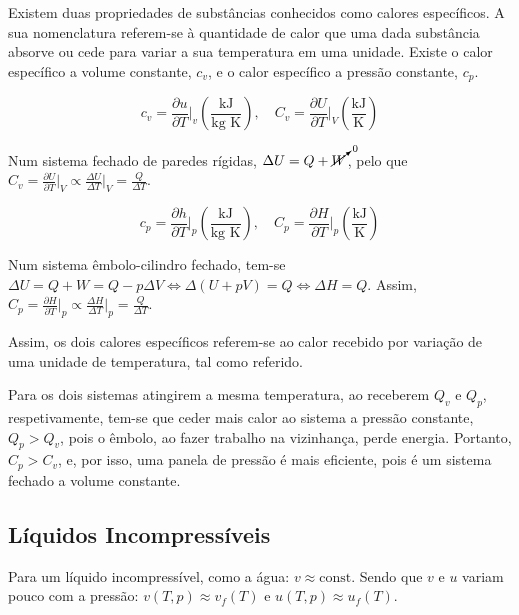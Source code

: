 Existem duas propriedades de substâncias conhecidos como calores específicos. A sua nomenclatura referem-se à quantidade de calor que uma dada substância absorve ou cede para variar a sua temperatura em uma unidade. Existe o calor específico a volume constante, $c_v$, e o calor específico a pressão constante, $c_p$.  

\begin{equation}
    c_v = \frac{\partial u}{\partial T} \bigr|_{v} \left( \frac{\text{kJ}}{\text{kg K}} \right), \quad C_v = \frac{\partial U}{\partial T} \bigr|_{V} \left( \frac{\text{kJ}}{\text{K}} \right)
\end{equation}

Num sistema fechado de paredes rígidas, $\Delta U = Q + \cancelto{0}{W}$, pelo que $C_v = \frac{\partial U}{\partial T} \bigr|_{V} \propto \frac{\Delta U}{\Delta T}\bigr|_{V} = \frac{Q}{\Delta T}$.

\begin{equation}
    c_p = \frac{\partial h}{\partial T} \bigr|_{p} \left( \frac{\text{kJ}}{\text{kg K}} \right), \quad C_p = \frac{\partial H}{\partial T} \bigr|_{p} \left( \frac{\text{kJ}}{\text{K}} \right)
\end{equation}

Num sistema êmbolo-cilindro fechado, tem-se $\Delta U = Q + W = Q - p \Delta V \Longleftrightarrow \Delta (U + pV) = Q \Longleftrightarrow \Delta H = Q$. Assim, $C_p = \frac{\partial H}{\partial T} \bigr|_{p} \propto \frac{\Delta H}{\Delta T}\bigr|_{p} = \frac{Q}{\Delta T}$.

Assim, os dois calores específicos referem-se ao calor recebido por variação de uma unidade de temperatura, tal como referido.

Para os dois sistemas atingirem a mesma temperatura, ao receberem $Q_v$ e $Q_p$, respetivamente, tem-se que ceder mais calor ao sistema a pressão constante, $Q_p > Q_v$, pois o êmbolo, ao fazer trabalho na vizinhança, perde energia. Portanto, $C_p > C_v$, e, por isso, uma panela de pressão é mais eficiente, pois é um sistema fechado a volume constante.

\subsection{Líquidos Incompressíveis}

Para um líquido incompressível, como a água: $v \approx \text{const}$. Sendo que $v$ e $u$ variam pouco com a pressão: $v(T,p) \approx v_f(T)$ e $u(T,p) \approx u_f(T)$.

